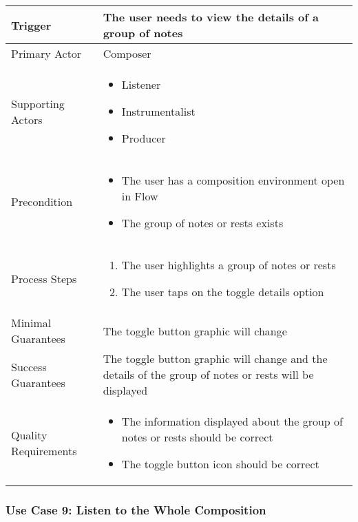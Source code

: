 \begin{tabularx}{\textwidth}{|X|X|}
\hline
Trigger & 
The user needs to view the details of a group of notes \\
\hline
Primary Actor & 
Composer \\
\hline
Supporting Actors & 
\begin{itemize}
\item Listener
\item Instrumentalist
\item Producer
\end{itemize} \\
\hline
Precondition & 
\begin{itemize}
\item The user has a composition environment open in Flow
\item The group of notes or rests exists
\end{itemize} \\
\hline
Process Steps & 
\begin{enumerate}
\item The user highlights a group of notes or rests
\item The user taps on the toggle details option 
\end{enumerate} \\
\hline
Minimal Guarantees & 
The toggle button graphic will change \\
\hline
Success Guarantees & 
The toggle button graphic will change and the details of the group of notes or rests will be displayed\\
\hline
Quality Requirements & 
\begin{itemize}
\item The information displayed about the group of notes or rests should be correct
\item The toggle button icon should be correct 
\end{itemize} \\ 
\hline
\end{tabularx}

\subsubsection{Use Case 9: Listen to the Whole Composition}


